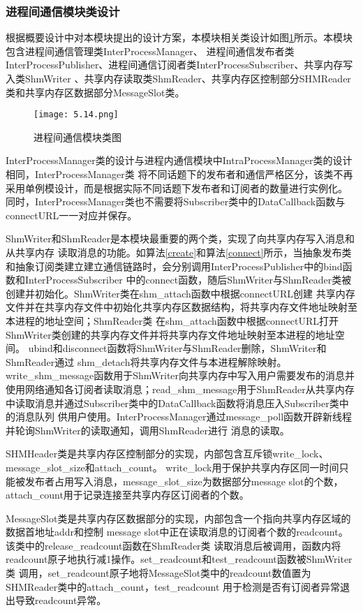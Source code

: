 \subsubsection{进程间通信模块类设计}
根据概要设计中对本模块提出的设计方案，本模块相关类设计如图\ref{interprocess_communication_class}所示。本模块包含进程间通信管理类InterProcessManager、
进程间通信发布者类InterProcessPublisher、进程间通信订阅者类InterProcessSubscriber、共享内存写入类ShmWriter
、共享内存读取类ShmReader、共享内存区控制部分SHMReader类和共享内存区数据部分MessageSlot类。

\begin{figure}[H]
  \centering
  \texttt{[image: 5.14.png]}
  \caption{进程间通信模块类图}
  \label{interprocess_communication_class}
\end{figure}
InterProcessManager类的设计与进程内通信模块中IntraProcessManager类的设计相同，InterProcessManager类
将不同话题下的发布者和通信严格区分，该类不再采用单例模设计，而是根据实际不同话题下发布者和订阅者的数量进行实例化。
同时，InterProcessManager类也不需要将Subscriber类中的DataCallback函数与connectURL一一对应并保存。

ShmWriter和ShmReader是本模块最重要的两个类，实现了向共享内存写入消息和从共享内存
读取消息的功能。如算法\ref{create}和算法\ref{connect}所示，当抽象发布类和抽象订阅类建立建立通信链路时，会分别调用InterProcessPublisher中的bind函数和InterProcessSubscriber
中的connect函数，随后ShmWriter与ShmReader类被创建并初始化。ShmWriter类在shm\_attach函数中根据connectURL创建
共享内存文件并在共享内存文件中初始化共享内存区数据结构，将共享内存文件地址映射至本进程的地址空间；ShmReader类
在shm\_attach函数中根据connectURL打开ShmWriter类创建的共享内存文件并将共享内存文件地址映射至本进程的地址空间。
ubind和disconnect函数将ShmWriter与ShmReader删除，ShmWriter和ShmReader通过
shm\_detach将共享内存文件与本进程解除映射。write\_shm\_message函数用于ShmWriter向共享内存中写入用户需要发布的消息并
使用网络通知各订阅者读取消息；read\_shm\_message用于ShmReader从共享内存中读取消息并通过Subscriber类中的DataCallback函数将消息压入Subscriber类中的消息队列
供用户使用。InterProcessManager通过message\_poll函数开辟新线程并轮询ShmWriter的读取通知，调用ShmReader进行
消息的读取。

SHMHeader类是共享内存区控制部分的实现，内部包含互斥锁write\_lock、message\_slot\_size和attach\_count。
write\_lock用于保护共享内存区同一时间只能被发布者占用写入消息，message\_slot\_size为数据部分message slot的个数，
attach\_count用于记录连接至共享内存区订阅者的个数。

MessageSlot类是共享内存区数据部分的实现，内部包含一个指向共享内存区域的数据首地址addr和控制
message slot中正在读取消息的订阅者个数的readcount。该类中的release\_readcount函数在ShmReader类
读取消息后被调用，函数内将readcount原子地执行减1操作。set\_readcount和test\_readcount函数被ShmWriter类
调用，set\_readcount原子地将MessageSlot类中的readcount数值置为SHMReader类中的attach\_count，test\_readcount
用于检测是否有订阅者异常退出导致readcount异常。

